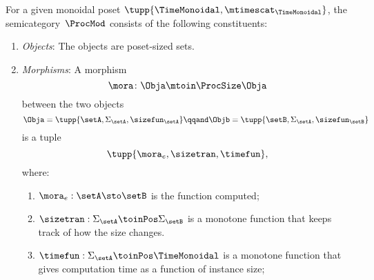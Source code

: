 \begin{definition}
    \label{def:ProcMod}
    For a given monoidal poset $\tupp{\TimeMonoidal, \mtimescat_{\TimeMonoidal}}$, the semicategory~$\ProcMod$ consists of the following constituents:
    \begin{enumerate}
        \item \emph{Objects}: The objects are poset-sized sets.
        \item \emph{Morphisms}: A morphism
              \begin{equation}
                  \mora \colon \Obja \mtoin\ProcSize \Obja
              \end{equation}
              between the two objects
              \begin{equation}
                  \Obja = \tupp{\setA, \Sigma_{\setA}, \sizefun_{\setA}}
                  \qqand
                  \Objb = \tupp{\setB, \Sigma_{\setA}, \sizefun_{\setB}}
              \end{equation}
              is a tuple
              \begin{equation}
                  \tupp{\mora_e, \sizetran, \timefun },
              \end{equation}
              where:
              \begin{enumerate}
                  \item $\mora_e : \setA \sto \setB$ is the function computed;
                  \item $\sizetran: \Sigma_{\setA} \toinPos \Sigma_{\setB}$ is a monotone function that keeps track of how the size changes.
                  \item $\timefun: \Sigma_{\setA} \toinPos \TimeMonoidal$ is a monotone function that gives computation time as a function of instance size;
              \end{enumerate}


\end{enumerate}
\end{definition}
